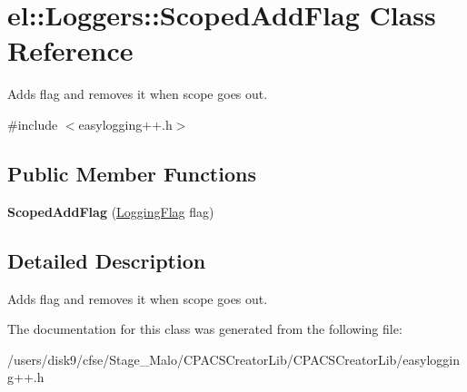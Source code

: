 \hypertarget{classel_1_1Loggers_1_1ScopedAddFlag}{\section{el\-:\-:Loggers\-:\-:Scoped\-Add\-Flag Class Reference}
\label{classel_1_1Loggers_1_1ScopedAddFlag}
}


Adds flag and removes it when scope goes out.  




{\ttfamily \#include $<$easylogging++.\-h$>$}

\subsection*{Public Member Functions}
\begin{DoxyCompactItemize}
\item 
\hypertarget{classel_1_1Loggers_1_1ScopedAddFlag_a13e0b1052cd1a7a15fae63fd6454d598}{{\bfseries Scoped\-Add\-Flag} (\hyperlink{namespaceel_a2784aacd04cb7816ac1c0b20fcbf83cb}{Logging\-Flag} flag)}\label{classel_1_1Loggers_1_1ScopedAddFlag_a13e0b1052cd1a7a15fae63fd6454d598}

\end{DoxyCompactItemize}


\subsection{Detailed Description}
Adds flag and removes it when scope goes out. 

The documentation for this class was generated from the following file\-:\begin{DoxyCompactItemize}
\item 
/users/disk9/cfse/\-Stage\-\_\-\-Malo/\-C\-P\-A\-C\-S\-Creator\-Lib/\-C\-P\-A\-C\-S\-Creator\-Lib/easylogging++.\-h\end{DoxyCompactItemize}
